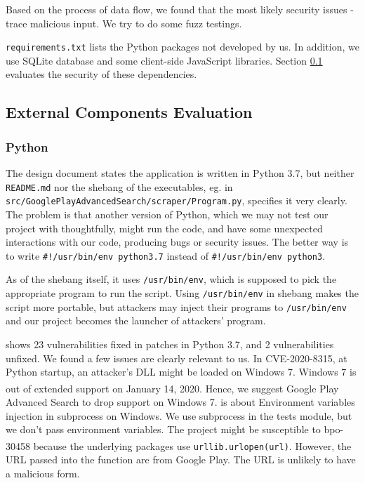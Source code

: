 \documentclass[12pt, a4paper]{article}
\newcommand{\code}[1]{\texttt{#1}}
\begin{document}
Based on the process of data flow, we found that the most likely security issues - trace malicious input. We try to do some fuzz testings. 

\code{requirements.txt} lists the Python packages not developed by us. In addition, we use SQLite database and some client-side JavaScript libraries. Section \ref{dependency-evaluation} evaluates the security of these dependencies.


\subsection{External Components Evaluation}
\label{dependency-evaluation}
\subsubsection{Python}
The design document states the application is written in Python 3.7, but neither \code{README.md} nor the shebang of the executables, eg. in \code{src/\linebreak[0]GooglePlayAdvancedSearch/scraper/Program.py}, specifies it very clearly. The problem is that another version of Python, which we may not test our project with thoughtfully, might run the code, and have some unexpected interactions with our code, producing bugs or security issues. The better way is to write \code{\#!/usr/bin/env python3.7} instead of \code{\#!/usr/bin/env python3}.

As of the shebang itself, it uses \code{/usr/bin/env}, which is supposed to pick the appropriate program to run the script. Using \code{/usr/bin/env} in shebang makes the script more portable, but attackers may inject their programs to \code{/usr/bin/env} and our project becomes the launcher of attackers' program.


\cite{python37-vulnerability} shows 23 vulnerabilities fixed in patches in Python 3.7, and 2 vulnerabilities unfixed. We found a few issues are clearly relevant to us. In CVE-2020-8315, at Python startup, an attacker's DLL might be loaded on Windows 7. Windows 7 is out of extended support on January 14, 2020.\textsuperscript{\cite{windows7}} Hence, we suggest Google Play Advanced Search to drop support on Windows 7. \cite{bpo-30730} is about Environment variables injection in subprocess on Windows. We use subprocess in the tests module, but we don't pass environment variables. The project might be susceptible to bpo-30458\textsuperscript{\cite{bpo-30458}} because the underlying packages use \code{urllib.urlopen(url)}. However, the URL passed into the function are from Google Play. The URL is unlikely to have a malicious form.
\end{document}
